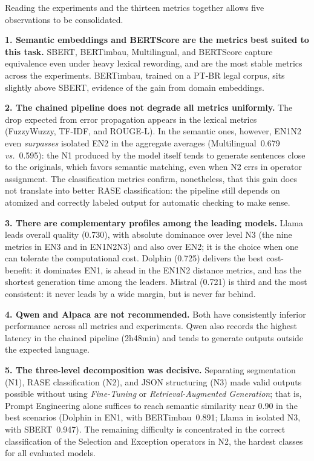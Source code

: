 \documentclass[a4paper,fleqn]{cas-sc}
\begin{document}
Reading the experiments and the thirteen metrics together allows five observations to be consolidated.

\textbf{1. Semantic embeddings and BERTScore are the metrics best suited to this task.} SBERT, BERTimbau, Multilingual, and BERTScore capture equivalence even under heavy lexical rewording, and are the most stable metrics across the experiments. BERTimbau, trained on a PT-BR legal corpus, sits slightly above SBERT, evidence of the gain from domain embeddings.

\textbf{2. The chained pipeline does not degrade all metrics uniformly.} The drop expected from error propagation appears in the lexical metrics (FuzzyWuzzy, TF-IDF, and ROUGE-L). In the semantic ones, however, EN1N2 even \textit{surpasses} isolated EN2 in the aggregate averages (Multilingual~0.679 \textit{vs.}~0.595): the N1 produced by the model itself tends to generate sentences close to the originals, which favors semantic matching, even when N2 errs in operator assignment. The classification metrics confirm, nonetheless, that this gain does not translate into better RASE classification: the pipeline still depends on atomized and correctly labeled output for automatic checking to make sense.

\textbf{3. There are complementary profiles among the leading models.} Llama leads overall quality (0.730), with absolute dominance over level N3 (the nine metrics in EN3 and in EN1N2N3) and also over EN2; it is the choice when one can tolerate the computational cost. Dolphin (0.725) delivers the best cost-benefit: it dominates EN1, is ahead in the EN1N2 distance metrics, and has the shortest generation time among the leaders. Mistral (0.721) is third and the most consistent: it never leads by a wide margin, but is never far behind.

\textbf{4. Qwen and Alpaca are not recommended.} Both have consistently inferior performance across all metrics and experiments. Qwen also records the highest latency in the chained pipeline (2h48min) and tends to generate outputs outside the expected language.

\textbf{5. The three-level decomposition was decisive.} Separating segmentation (N1), RASE classification (N2), and JSON structuring (N3) made valid outputs possible without using \textit{Fine-Tuning} or \textit{Retrieval-Augmented Generation}; that is, Prompt Engineering alone suffices to reach semantic similarity near 0.90 in the best scenarios (Dolphin in EN1, with BERTimbau~0.891; Llama in isolated N3, with SBERT~0.947). The remaining difficulty is concentrated in the correct classification of the Selection and Exception operators in N2, the hardest classes for all evaluated models.
\end{document}
